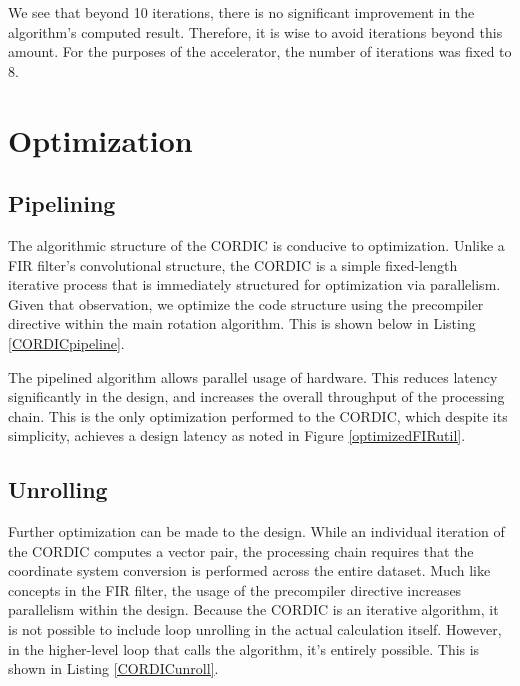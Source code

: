 \documentclass[../report_polarFIR.tex]{subfiles}
\begin{document}
We see that beyond 10 iterations, there is no significant improvement in the algorithm's computed result. Therefore, it is wise to avoid iterations beyond this amount. For the purposes of the accelerator, the number of iterations was fixed to 8.


\section{Optimization}

\subsection{Pipelining}
The algorithmic structure of the CORDIC is conducive to optimization. Unlike a FIR filter's convolutional structure, the CORDIC is a simple fixed-length iterative process that is immediately structured for optimization via parallelism.  Given that observation, we optimize the code structure using the precompiler directive  within the main rotation algorithm. This is shown below in Listing \ref{CORDICpipeline}.

		\begin{singlespace}
            
        \end{singlespace}
        
The pipelined algorithm allows parallel usage of hardware. This reduces latency significantly in the design, and increases the overall throughput of the processing chain. This is the only optimization performed to the CORDIC, which despite its simplicity, achieves a design latency as noted in Figure \ref{optimizedFIRutil}.

\subsection{Unrolling}

Further optimization can be made to the design. While an individual iteration of the CORDIC computes a vector pair, the processing chain requires that the coordinate system conversion is performed across the entire dataset. Much like concepts in the FIR filter, the usage of the precompiler directive  increases parallelism within the design. Because the CORDIC is an iterative algorithm, it is not possible to include loop unrolling in the actual calculation itself. However, in the higher-level loop that calls the algorithm, it's entirely possible. This is shown in Listing \ref{CORDICunroll}.
\end{document}
